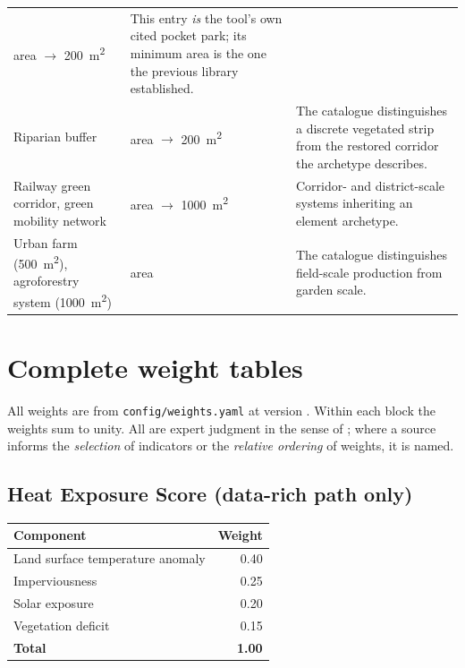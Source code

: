 \begin{longtable}{@{}>{\raggedright\arraybackslash}p{52mm}
                    >{\raggedright\arraybackslash}p{26mm}
                    >{\raggedright\arraybackslash}p{50mm}@{}}
area $\rightarrow$ \qty{200}{\metre\squared} &
This entry \emph{is} the tool's own cited pocket park; its minimum area is the
one the previous library established. \\
\addlinespace
Riparian buffer &
area $\rightarrow$ \qty{200}{\metre\squared} &
The catalogue distinguishes a discrete vegetated strip from the restored
corridor the archetype describes. \\
\addlinespace
Railway green corridor, green mobility network &
area $\rightarrow$ \qty{1000}{\metre\squared} &
Corridor- and district-scale systems inheriting an element archetype. \\
\addlinespace
Urban farm (\qty{500}{\metre\squared}), agroforestry system
(\qty{1000}{\metre\squared}) &
area &
The catalogue distinguishes field-scale production from garden scale. \\
\end{longtable}

\clearpage
\section{Complete weight tables}
\label{app:weights}

All weights are from \texttt{config/weights.yaml} at version \methver{}. Within
each block the weights sum to unity. All are expert judgment in the sense of
\textcite{nardo2008}; where a source informs the \emph{selection} of indicators
or the \emph{relative ordering} of weights, it is named.

\subsection{Heat Exposure Score (data-rich path only)}

\begin{center}\small
\begin{tabular}{@{}lr@{}}
\toprule
\textbf{Component} & \textbf{Weight} \\
\midrule
Land surface temperature anomaly & 0.40 \\
Imperviousness                   & 0.25 \\
Solar exposure                   & 0.20 \\
Vegetation deficit               & 0.15 \\
\midrule
\textbf{Total} & \textbf{1.00} \\
\bottomrule
\end{tabular}
\end{center}

